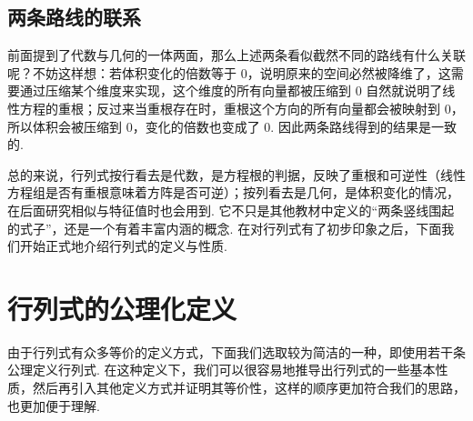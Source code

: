 
\subsection{两条路线的联系}

前面提到了代数与几何的一体两面，那么上述两条看似截然不同的路线有什么关联呢？不妨这样想：若体积变化的倍数等于 $0$，说明原来的空间必然被降维了，这需要通过压缩某个维度来实现，这个维度的所有向量都被压缩到 $0$ 自然就说明了线性方程的重根；反过来当重根存在时，重根这个方向的所有向量都会被映射到 $0$，所以体积会被压缩到 $0$，变化的倍数也变成了 $0$. 因此两条路线得到的结果是一致的.



总的来说，行列式按行看去是代数，是方程根的判据，反映了重根和可逆性（线性方程组是否有重根意味着方阵是否可逆）；按列看去是几何，是体积变化的情况，在后面研究相似与特征值时也会用到. 它不只是其他教材中定义的``两条竖线围起的式子''，还是一个有着丰富内涵的概念. 在对行列式有了初步印象之后，下面我们开始正式地介绍行列式的定义与性质.

\section{行列式的公理化定义}

由于行列式有众多等价的定义方式，下面我们选取较为简洁的一种，即使用若干条公理定义行列式. 在这种定义下，我们可以很容易地推导出行列式的一些基本性质，然后再引入其他定义方式并证明其等价性，这样的顺序更加符合我们的思路，也更加便于理解.

